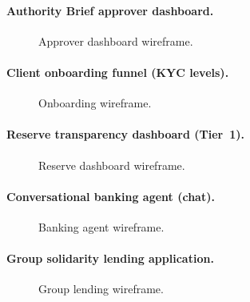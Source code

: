 \paragraph{Authority Brief approver dashboard.}
\begin{figure}[H]
\centering
{}
\caption[Approver dashboard wireframe]{Approver dashboard wireframe.}
\label{fig:ui-wireframe-approver}
\end{figure}

\paragraph{Client onboarding funnel (KYC levels).}
\begin{figure}[H]
\centering
{}
\caption[Onboarding wireframe]{Onboarding wireframe.}
\label{fig:ui-wireframe-onboarding}
\end{figure}

\paragraph{Reserve transparency dashboard (Tier~1).}
\begin{figure}[H]
\centering
{}
\caption[Reserve dashboard wireframe]{Reserve dashboard wireframe.}
\label{fig:ui-wireframe-reserve}
\end{figure}

\paragraph{Conversational banking agent (chat).}
\begin{figure}[H]
\centering
{}
\caption[Banking agent wireframe]{Banking agent wireframe.}
\label{fig:ui-wireframe-agent}
\end{figure}

\paragraph{Group solidarity lending application.}
\begin{figure}[H]
\centering
{}
\caption[Group lending wireframe]{Group lending wireframe.}
\label{fig:ui-wireframe-group-lending}
\end{figure}

